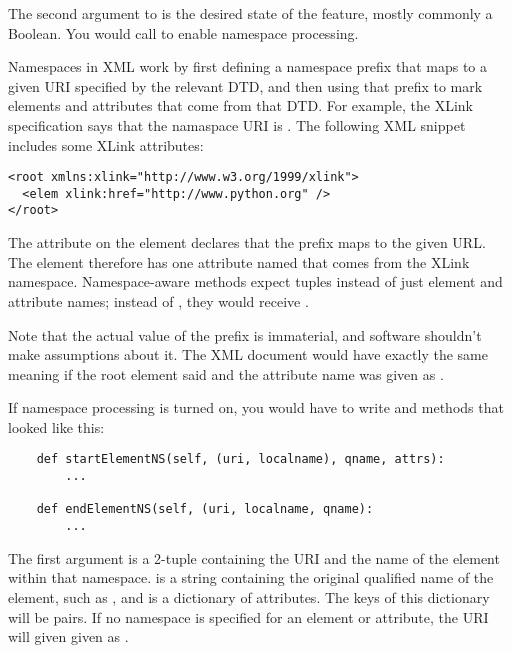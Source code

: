 \documentclass{howto}
\newcommand{\element}[1]{\code{#1}}
\newcommand{\attribute}[1]{\code{#1}}
\begin{document}
The second argument to  is the desired state of
the feature, mostly commonly a Boolean.  You would call
 to enable namespace
processing.

Namespaces in XML work by first defining a namespace prefix that maps
to a given URI specified by the relevant DTD, and then using that
prefix to mark elements and attributes that come from that DTD.  For
example, the XLink specification says that the namaspace URI is 
.  The following XML snippet
includes some XLink attributes:

\begin{verbatim}
<root xmlns:xlink="http://www.w3.org/1999/xlink">
  <elem xlink:href="http://www.python.org" />
</root>
\end{verbatim}

The \attribute{xmlns:xlink} attribute on the \element{root} element
declares that the prefix  maps to the given URL.  The
\element{elem} element therefore has one attribute named
\attribute{href} that comes from the XLink namespace.  Namespace-aware
methods expect  tuples instead of just
element and attribute names; instead of , they would
receive .

Note that the actual value of the prefix is immaterial, and software
shouldn't make assumptions about it.  The XML document would have
exactly the same meaning if the root element said
 and the attribute name was given as
.

If namespace processing is turned on, you would have to write
 and  methods that
looked like this:

\begin{verbatim}
    def startElementNS(self, (uri, localname), qname, attrs):
        ...

    def endElementNS(self, (uri, localname, qname):
        ...
\end{verbatim}

The first argument is a 2-tuple containing the URI and the name of the
element within that namespace.   is a string containing the
original qualified name of the element, such as , and
 is a dictionary of attributes.  The keys of this
dictionary will be  pairs.  If
no namespace is specified for an element or attribute, the URI will
given given as .
\end{document}
